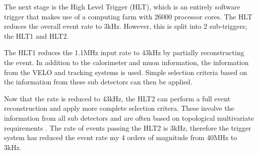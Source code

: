 The next stage is the High Level Trigger (HLT), which is an entirely software trigger that makes use of a computing farm with 26000 processor cores.  The HLT reduces the overall event rate to 3kHz.  However, this is split into 2 sub-triggers; the HLT1 and HLT2.

The HLT1 reduces the 1.1MHz input rate to 43kHz by partially reconstructing the event.  In addition to the calorimeter and muon information, the information from the VELO and tracking systems is used.  Simple selection criteria based on the information from these sub detectors can then be applied.

Now that the rate is reduced to 43kHz, the HLT2 can perform a full event reconstruction and apply more complete selection critera.  These involve the information from all sub detectors and are often based on topological multivariate requirements \cite{BBDT}.  The rate of events passing the HLT2 is 3kHz, therefore the \lhcb trigger system has reduced the event rate my 4 orders of magnitude from 40MHz to 3kHz.


\clearpage
